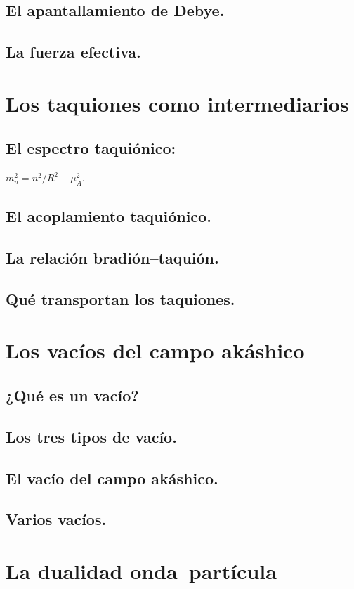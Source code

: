 \subsection{El apantallamiento de Debye.}
\subsection{La fuerza efectiva.}

\section{Los taquiones como intermediarios}
\subsection{El espectro taquiónico:} $m_n^2 = n^2/R^2 - \mu_A^2$.
\subsection{El acoplamiento taquiónico.}
\subsection{La relación bradión--taquión.}
\subsection{Qué transportan los taquiones.}

\section{Los vacíos del campo akáshico}
\subsection{¿Qué es un vacío?}
\subsection{Los tres tipos de vacío.}
\subsection{El vacío del campo akáshico.}
\subsection{Varios vacíos.}

\section{La dualidad onda--partícula}
